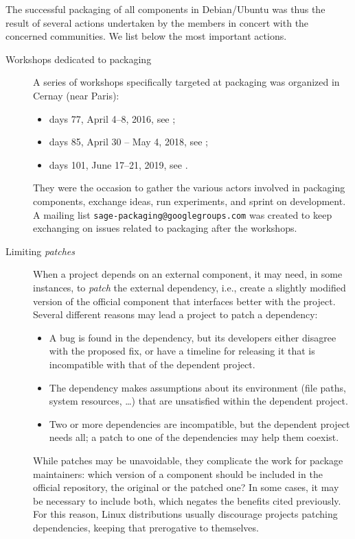 \documentclass{deliverablereport}
\begin{document}
The successful packaging of all \ODK components in Debian/Ubuntu was
thus the result of several actions undertaken by the \ODK members in
concert with the concerned communities. %
We list below the most important actions.

\begin{description}
\item[Workshops dedicated to packaging] A series of workshops
  specifically targeted at packaging was organized in Cernay (near
  Paris):
  \begin{itemize}
  \item \Sage days 77, April 4--8, 2016, see ;
  \item \Sage days 85, April 30 -- May 4, 2018, see ;
  \item \Sage days 101, June 17--21, 2019, see .
  \end{itemize}
  They were the occasion to gather the various actors involved in
  packaging \ODK components, exchange ideas, run experiments, and
  sprint on development. %
  A mailing list \texttt{sage-packaging@googlegroups.com} was created
  to keep exchanging on issues related to packaging after the
  workshops.

\item[Limiting \emph{patches}] When a project depends on an external
  component, it may need, in some instances, to \emph{patch} the
  external dependency, i.e., create a slightly modified version of the
  official component that interfaces better with the project. %
  Several different reasons may lead a project to patch a dependency:
  \begin{itemize}
  \item A bug is found in the dependency, but its developers either
    disagree with the proposed fix, or have a timeline for releasing
    it that is incompatible with that of the dependent project.
  \item The dependency makes assumptions about its environment (file
    paths, system resources, \dots) that are unsatisfied within the
    dependent project.
  \item Two or more dependencies are incompatible, but the dependent
    project needs all; a patch to one of the dependencies may help
    them coexist.
  \end{itemize}

  While patches may be unavoidable, they complicate the work for
  package maintainers: which version of a component should be included
  in the official repository, the original or the patched one? %
  In some cases, it may be necessary to include both, which negates
  the benefits cited previously. %
  For this reason, Linux distributions usually discourage projects
  patching dependencies, keeping that prerogative to themselves. %


\end{description}
\end{document}
